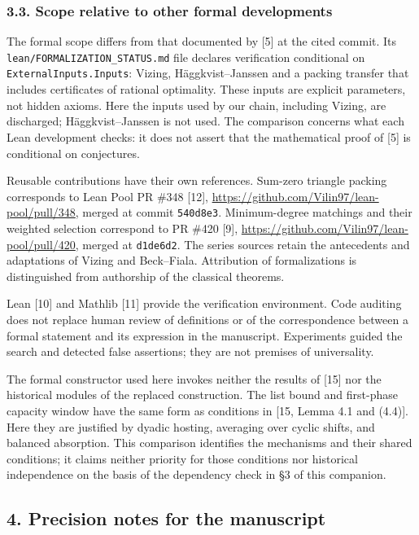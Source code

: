 \documentclass[english,11pt,a4paper]{article}
\begin{document}
\subsubsection{3.3. Scope relative to other formal
developments}\label{scope-relative-to-other-formal-developments}

The formal scope differs from that documented by {[}5{]} at the cited
commit. Its \nolinkurl{lean/FORMALIZATION_STATUS.md} file declares
verification conditional on \nolinkurl{ExternalInputs.Inputs}: Vizing,
Häggkvist--Janssen and a packing transfer that includes certificates of
rational optimality. These inputs are explicit parameters, not hidden
axioms. Here the inputs used by our chain, including Vizing, are
discharged; Häggkvist--Janssen is not used. The comparison concerns what
each Lean development checks: it does not assert that the mathematical
proof of {[}5{]} is conditional on conjectures.

Reusable contributions have their own references. Sum-zero triangle
packing corresponds to Lean Pool PR \#348 {[}12{]},
\url{https://github.com/Vilin97/lean-pool/pull/348}, merged at commit
\nolinkurl{540d8e3}. Minimum-degree matchings and their weighted selection
correspond to PR \#420 {[}9{]},
\url{https://github.com/Vilin97/lean-pool/pull/420}, merged at
\nolinkurl{d1de6d2}. The series sources retain the antecedents and
adaptations of Vizing and Beck--Fiala. Attribution of formalizations is
distinguished from authorship of the classical theorems.

Lean {[}10{]} and Mathlib {[}11{]} provide the verification environment.
Code auditing does not replace human review of definitions or of the
correspondence between a formal statement and its expression in the
manuscript. Experiments guided the search and detected false assertions;
they are not premises of universality.

The formal constructor used here invokes neither the results of {[}15{]}
nor the historical modules of the replaced construction. The list bound
and first-phase capacity window have the same form as conditions in
{[}15, Lemma 4.1 and (4.4){]}. Here they are justified by dyadic
hosting, averaging over cyclic shifts, and balanced absorption. This
comparison identifies the mechanisms and their shared conditions; it
claims neither priority for those conditions nor historical independence
on the basis of the dependency check in §3 of this companion.

\subsection{4. Precision notes for the
manuscript}\label{precision-notes-for-the-manuscript}
\end{document}
